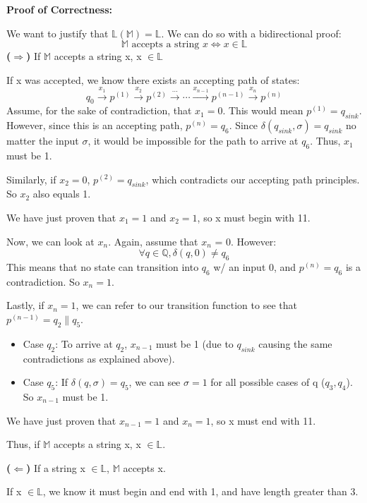 \documentclass[12pt]{article}
\begin{document}
\begin{enumerate}[\bf P1.]
\textbf{Proof of Correctness:}

We want to justify that $\mathbb{L}(\mathbb{M}) = \mathbb{L}$. We can do so with a bidirectional proof:
\[ 
\mathbb{M} \text{ accepts a string } x \Leftrightarrow{} x \in \mathbb{L}
\]
\textbf{($\Rightarrow$)} If $\mathbb{M}$ accepts a string x, x $\in \mathbb{L}$

If x was accepted, we know there exists an accepting path of states:
\[
q_0 \xrightarrow{x_1} p^{(1)} \xrightarrow{x_2} p^{(2)} \xrightarrow{\cdots} \cdots \xrightarrow{x_{n-1}} p^{(n-1)} \xrightarrow{x_n} p^{(n)}
\]
Assume, for the sake of contradiction, that $x_1 = 0$. This would mean $p^{(1)} = q_{sink}$. However, since this is an accepting path, $p^{(n)} = q_6$. Since $\delta(q_{sink}, \sigma) = q_{sink}$ no matter the input $\sigma$, it would be impossible for the path to arrive at $q_6$. Thus, $x_1$ must be 1.

Similarly, if $x_2 = 0$, $p^{(2)} = q_{sink}$, which contradicts our accepting path principles. So $x_2$ also equals 1.

We have just proven that $x_{1}=1$ and $x_2=1$, so x must begin with 11.

Now, we can look at $x_n$. Again, assume that $x_n$ = 0. However:
\[
\forall q \in \mathbb{Q}, \delta(q, 0) \neq q_6
\]
This means that no state can transition into $q_6$ w/ an input 0, and $p^{(n)} = q_6$ is a contradiction. So $x_n = 1$.

Lastly, if $x_n = 1$, we can refer to our transition function to see that $p^{(n-1)} = q_2 \| q_5$.

\begin{itemize}
    \item Case $q_2$: To arrive at $q_2$, $x_{n-1}$ must be 1 (due to $q_{sink}$ causing the same contradictions as explained above).
    \item Case $q_5$: If $\delta(q, \sigma) = q_5$, we can see $\sigma = 1$ for all possible cases of q ($q_3, q_4$). So $x_{n-1}$ must be 1.
\end{itemize}

We have just proven that $x_{n-1}=1$ and $x_n=1$, so x must end with 11.

Thus, if $\mathbb{M}$ accepts a string x, x $\in \mathbb{L}$.

\vspace{1.5em}

\textbf{($\Leftarrow$)} If a string x $\in \mathbb{L}$, $\mathbb{M}$ accepts x.

If x $\in \mathbb{L}$, we know it must begin and end with 1, and have length greater than 3. 


\end{enumerate}
\end{document}
